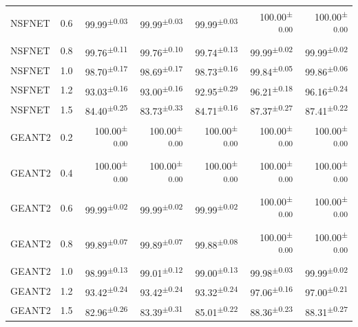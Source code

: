 \documentclass[final,5p]{elsarticle}
\begin{document}
\begin{table}[t]
{{\begin{tabular}{llrrrrr}
NSFNET & 0.6 & 99.99\textsuperscript{$\pm$0.03} & 99.99\textsuperscript{$\pm$0.03} & 99.99\textsuperscript{$\pm$0.03} & 100.00\textsuperscript{$\pm$0.00} & 100.00\textsuperscript{$\pm$0.00} \\
NSFNET & 0.8 & 99.76\textsuperscript{$\pm$0.11} & 99.76\textsuperscript{$\pm$0.10} & 99.74\textsuperscript{$\pm$0.13} & 99.99\textsuperscript{$\pm$0.02} & 99.99\textsuperscript{$\pm$0.02} \\
NSFNET & 1.0 & 98.70\textsuperscript{$\pm$0.17} & 98.69\textsuperscript{$\pm$0.17} & 98.73\textsuperscript{$\pm$0.16} & 99.84\textsuperscript{$\pm$0.05} & 99.86\textsuperscript{$\pm$0.06} \\
NSFNET & 1.2 & 93.03\textsuperscript{$\pm$0.16} & 93.00\textsuperscript{$\pm$0.16} & 92.95\textsuperscript{$\pm$0.29} & 96.21\textsuperscript{$\pm$0.18} & 96.16\textsuperscript{$\pm$0.24} \\
NSFNET & 1.5 & 84.40\textsuperscript{$\pm$0.25} & 83.73\textsuperscript{$\pm$0.33} & 84.71\textsuperscript{$\pm$0.16} & 87.37\textsuperscript{$\pm$0.27} & 87.41\textsuperscript{$\pm$0.22} \\
GEANT2 & 0.2 & 100.00\textsuperscript{$\pm$0.00} & 100.00\textsuperscript{$\pm$0.00} & 100.00\textsuperscript{$\pm$0.00} & 100.00\textsuperscript{$\pm$0.00} & 100.00\textsuperscript{$\pm$0.00} \\
GEANT2 & 0.4 & 100.00\textsuperscript{$\pm$0.00} & 100.00\textsuperscript{$\pm$0.00} & 100.00\textsuperscript{$\pm$0.00} & 100.00\textsuperscript{$\pm$0.00} & 100.00\textsuperscript{$\pm$0.00} \\
GEANT2 & 0.6 & 99.99\textsuperscript{$\pm$0.02} & 99.99\textsuperscript{$\pm$0.02} & 99.99\textsuperscript{$\pm$0.02} & 100.00\textsuperscript{$\pm$0.00} & 100.00\textsuperscript{$\pm$0.00} \\
GEANT2 & 0.8 & 99.89\textsuperscript{$\pm$0.07} & 99.89\textsuperscript{$\pm$0.07} & 99.88\textsuperscript{$\pm$0.08} & 100.00\textsuperscript{$\pm$0.00} & 100.00\textsuperscript{$\pm$0.00} \\
GEANT2 & 1.0 & 98.99\textsuperscript{$\pm$0.13} & 99.01\textsuperscript{$\pm$0.12} & 99.00\textsuperscript{$\pm$0.13} & 99.98\textsuperscript{$\pm$0.03} & 99.99\textsuperscript{$\pm$0.02} \\
GEANT2 & 1.2 & 93.42\textsuperscript{$\pm$0.24} & 93.42\textsuperscript{$\pm$0.24} & 93.32\textsuperscript{$\pm$0.24} & 97.06\textsuperscript{$\pm$0.16} & 97.00\textsuperscript{$\pm$0.21} \\
GEANT2 & 1.5 & 82.96\textsuperscript{$\pm$0.26} & 83.39\textsuperscript{$\pm$0.31} & 85.01\textsuperscript{$\pm$0.22} & 88.36\textsuperscript{$\pm$0.23} & 88.31\textsuperscript{$\pm$0.27} \\

\bottomrule
\end{tabular}%
}}
\end{table}
\end{document}
